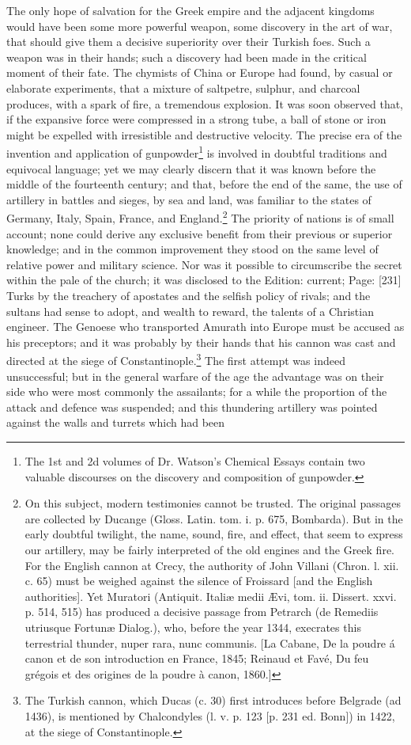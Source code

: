 The only hope of salvation for the Greek empire and the adjacent kingdoms would have been some more powerful weapon, some discovery in the art of war, that should give them a decisive superiority over their Turkish foes. Such a weapon was in their hands; such a discovery had been made in the critical moment of their fate. The chymists of China or Europe had found, by casual or elaborate experiments, that a mixture of saltpetre, sulphur, and charcoal produces, with a spark of fire, a tremendous explosion. It was soon observed that, if the expansive force were compressed in a strong tube, a ball of stone or iron might be expelled with irresistible and destructive velocity. The precise era of the invention and application of gunpowder\footnote{The 1st and 2d volumes of Dr. Watson\texthebrew{}’s Chemical Essays contain two valuable discourses on the discovery and composition of gunpowder.} is involved in doubtful traditions and equivocal language; yet we may clearly discern that it was known before the middle of the fourteenth century; and that, before the end of the same, the use of artillery in battles and sieges, by sea and land, was familiar to the states of Germany, Italy, Spain, France, and England.\footnote{On this subject, modern testimonies cannot be trusted. The original passages are collected by Ducange (Gloss. Latin. tom. i. p. 675, Bombarda). But in the early doubtful twilight, the name, sound, fire, and effect, that seem to express our artillery, may be fairly interpreted of the old engines and the Greek fire. For the English cannon at Crecy, the authority of John Villani (Chron. l. xii. c. 65) must be weighed against the silence of Froissard [and the English authorities]. Yet Muratori (Antiquit. Italiæ medii Ævi, tom. ii. Dissert. xxvi. p. 514, 515) has produced a decisive passage from Petrarch (de Remediis utriusque Fortunæ Dialog.), who, before the year 1344, execrates this terrestrial thunder, nuper rara, nunc communis. [La Cabane, De la poudre á canon et de son introduction en France, 1845; Reinaud et Favé, Du feu grégois et des origines de la poudre à canon, 1860.]} The priority of nations is of small account; none could derive any exclusive benefit from their previous or superior knowledge; and in the common improvement they stood on the same level of relative power and military science. Nor was it possible to circumscribe the secret within the pale of the church; it was disclosed to the Edition: current; Page: [231] Turks by the treachery of apostates and the selfish policy of rivals; and the sultans had sense to adopt, and wealth to reward, the talents of a Christian engineer. The Genoese who transported Amurath into Europe must be accused as his preceptors; and it was probably by their hands that his cannon was cast and directed at the siege of Constantinople.\footnote{The Turkish cannon, which Ducas (c. 30) first introduces before Belgrade (ad 1436), is mentioned by Chalcondyles (l. v. p. 123 [p. 231 ed. Bonn]) in 1422, at the siege of Constantinople.} The first attempt was indeed unsuccessful; but in the general warfare of the age the advantage was on their side who were most commonly the assailants; for a while the proportion of the attack and defence was suspended; and this thundering artillery was pointed against the walls and turrets which had been 